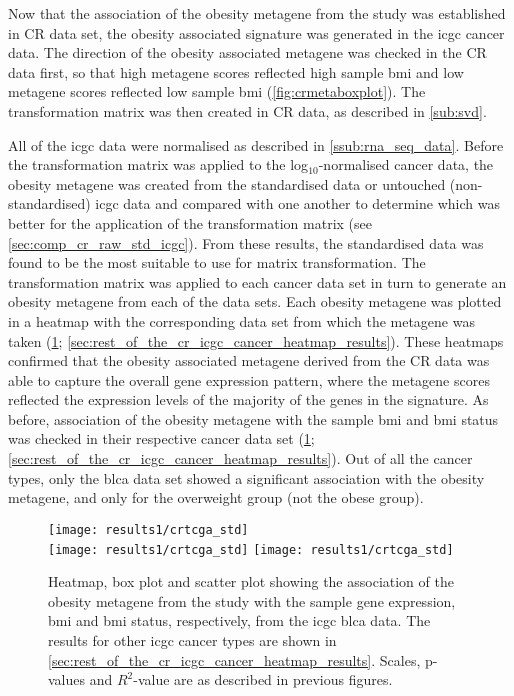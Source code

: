 \noindent
Now that the association of the obesity metagene from the \citet{Creighton2012} study was established in CR data set, the obesity associated signature was generated in the \gls{icgc} cancer data.
The direction of the obesity associated metagene was checked in the CR data first, so that high metagene scores reflected high sample \gls{bmi} and low metagene scores reflected low sample \gls{bmi} (\cref{fig:crmetaboxplot}).
The transformation matrix was then created in CR data, as described in \cref{sub:svd}.

All of the \gls{icgc} data were normalised as described in \cref{ssub:rna_seq_data}.
Before the transformation matrix was applied to the log$_{10}$-normalised cancer data, the obesity metagene was created from the standardised data or untouched (non-standardised) \gls{icgc} data and compared with one another to determine which was better for the application of the transformation matrix (see \cref{sec:comp_cr_raw_std_icgc}).
From these results, the standardised data was found to be the most suitable to use for matrix transformation.
The transformation matrix was applied to each cancer data set in turn to generate an obesity metagene from each of the data sets.
Each obesity metagene was plotted in a heatmap with the corresponding data set from which the metagene was taken (\cref{fig:crmetaicgc}; \cref{sec:rest_of_the_cr_icgc_cancer_heatmap_results}).
These heatmaps confirmed that the obesity associated metagene derived from the CR data was able to capture the overall gene expression pattern, where the metagene scores reflected the expression levels of the majority of the genes in the signature.
As before, association of the obesity metagene with the sample \gls{bmi} and \gls{bmi} status was checked in their respective cancer data set (\cref{fig:crmetaicgc}; \cref{sec:rest_of_the_cr_icgc_cancer_heatmap_results}).
Out of all the cancer types, only the \gls{blca} data set showed a significant association with the obesity metagene,  and only for the overweight group (not the obese group).

\begin{figure}[htp!]
	\centering
	\texttt{[image: results1/crtcga\_std]}\\
	\texttt{[image: results1/crtcga\_std]}
	\hfill
	\texttt{[image: results1/crtcga\_std]}
	\caption[Obesity metagene from the \citet{Creighton2012} study in the \acrshort{icgc} \acrshort{blca} data]{Heatmap, box plot and scatter plot showing the association of the obesity metagene from the \citet{Creighton2012} study with the sample gene expression, \gls{bmi} and \gls{bmi} status, respectively, from the \gls{icgc} \gls{blca} data.
	The results for other \gls{icgc} cancer types are shown in \cref{sec:rest_of_the_cr_icgc_cancer_heatmap_results}.
	Scales, p-values and $R^2$-value are as described in previous figures.}
	\label{fig:crmetaicgc}
\end{figure}

